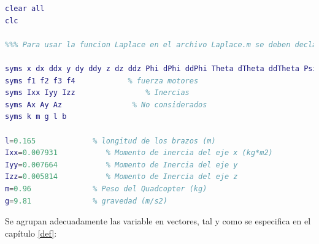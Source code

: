 \documentclass[twoside,11pt]{book}
\begin{document}
\singlespacing
\begin{lstlisting}[language=Matlab]
clear all
clc

%%% Para usar la funcion Laplace en el archivo Laplace.m se deben declarar las variables de esta manera:

syms x dx ddx y dy ddy z dz ddz Phi dPhi ddPhi Theta dTheta ddTheta Psi dPsi ddPsi
syms f1 f2 f3 f4 		    % fuerza motores
syms Ixx Iyy Izz				% Inercias
syms Ax Ay Az                % No considerados
syms k m g l b

l=0.165             % longitud de los brazos (m)
Ixx=0.007931           % Momento de inercia del eje x (kg*m2) 
Iyy=0.007664           % Momento de Inercia del eje y
Izz=0.005814           % Momento de Inercia del eje z
m=0.96              % Peso del Quadcopter (kg)
g=9.81              % gravedad (m/s2)
\end{lstlisting}

Se agrupan adecuadamente las variable en vectores, tal y como se especifica en el capítulo \ref{def}:
\end{document}
